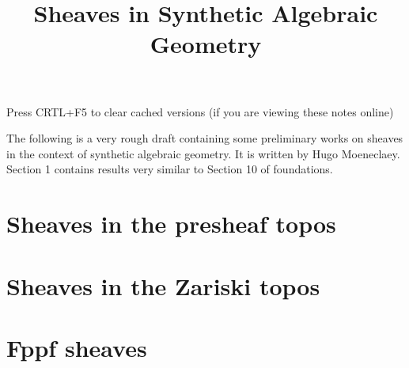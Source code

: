 \documentclass{../util/zariski}
\title{Sheaves in Synthetic Algebraic Geometry}
\begin{document}
\maketitle

\begin{center}
  \color{purple}
  \large{Press CRTL+F5 to clear cached versions}
  \large{(if you are viewing these notes online)}
\end{center}

The following is a very rough draft containing some preliminary works on sheaves in the context of synthetic algebraic geometry. It is written by Hugo Moeneclaey. Section 1 contains results very similar to Section 10 of foundations.

\tableofcontents

\section{Sheaves in the presheaf topos}


\section{Sheaves in the Zariski topos}


\section{Fppf sheaves}




\printindex

\printbibliography
\end{document}
